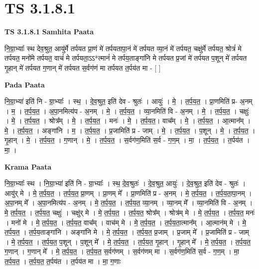 \documentclass[17pt]{extarticle}
\begin{document}
\section{ TS 3.1.8.1 }

\textbf{TS 3.1.8.1 } \newline
\textbf{Samhita Paata} \newline

नि॒ग्रा॒भ्याः᳚ स्थ देव॒श्रुत॒ आयु॑र्मे तर्पयत प्रा॒णं मे॑ तर्पयतापा॒नं मे॑ तर्पयत व्या॒नं मे॑ तर्पयत॒ चक्षु॑र्मे तर्पयत॒ श्रोत्रं॑ मे तर्पयत॒ मनो॑मे तर्पयत॒ वाचं॑ मे तर्पयता॒ऽऽ*त्मानं॑ मे तर्पय॒ताङ्गा॑नि मे तर्पयत प्र॒जां मे॑ तर्पयत प॒शून् मे॑ तर्पयत गृ॒हान् मे॑ तर्पयत ग॒णान् मे॑ तर्पयत स॒र्वग॑णं मा तर्पयत त॒र्पय॑त मा - [  ] \newline

\textbf{Pada Paata} \newline

नि॒ग्रा॒भ्या॑ इति॑ नि - ग्रा॒भ्याः᳚ । स्थ॒ । दे॒व॒श्रुत॒ इति॑ देव - श्रुतः॑ । आयुः॑ । मे॒ । त॒र्प॒य॒त॒ । प्रा॒णमिति॑ प्र- अ॒नम् । म॒ । त॒र्प॒य॒त॒ । अ॒पा॒नमित्य॑प - अ॒नम् । मे॒ । त॒र्प॒य॒त॒ । व्या॒नमिति॑ वि - अ॒नम् । मे॒ । त॒र्प॒य॒त॒ । चक्षुः॑ । मे॒ । त॒र्प॒य॒त॒ । श्रोत्र᳚म् । मे॒ । त॒र्प॒य॒त॒ । मनः॑ । मे॒ । त॒र्प॒य॒त॒। वाच᳚म् । मे॒ । त॒र्प॒य॒त॒ । आ॒त्मान᳚म् । मे॒ । त॒र्प॒य॒त॒ । अङ्गा॑नि । म॒ । त॒र्प॒य॒त॒ । प्र॒जामिति॑ प्र - जाम् । मे॒ । त॒र्प॒य॒त॒ । प॒शून् । मे॒ । त॒र्प॒य॒त॒ । गृ॒हान् । मे॒ । त॒र्प॒य॒त॒ । ग॒णान् । मे॒ । त॒र्प॒य॒त॒ । स॒र्वग॑ण॒मिति॑ स॒र्व - ग॒ण॒म् । मा॒ । त॒र्प॒य॒त॒ । त॒र्पय॑त । मा॒ ।  \newline


\textbf{Krama Paata} \newline

नि॒ग्रा॒भ्याः᳚ स्थ । नि॒ग्रा॒भ्या॑ इति॑ नि - ग्रा॒भ्याः᳚ । स्थ॒ दे॒व॒श्रुतः॑ । दे॒व॒श्रुत॒ आयुः॑ । दे॒व॒श्रुत॒ इति॑ देव - श्रुतः॑ । आयु॑र् मे । मे॒ त॒र्प॒य॒त॒ । त॒र्प॒य॒त॒ प्रा॒णम् । प्रा॒णम् मे᳚ । प्रा॒णमिति॑ प्र - अ॒नम् । मे॒ त॒र्प॒य॒त॒ । त॒र्प॒य॒ता॒पा॒नम् । अ॒पा॒नम् मे᳚ । अ॒पा॒नमित्य॑प - अ॒नम् । मे॒ त॒र्प॒य॒त॒ । त॒र्प॒य॒त॒ व्या॒नम् । व्या॒नम् मे᳚ । व्या॒नमिति॑ वि - अ॒नम् । मे॒ त॒र्प॒य॒त॒ । त॒र्प॒य॒त॒ चक्षुः॑ । चक्षु॑र् मे । मे॒ त॒र्प॒य॒त॒ । त॒र्प॒य॒त॒ श्रोत्र᳚म् । श्रोत्र॑म् मे । मे॒ त॒र्प॒य॒त॒ । त॒र्प॒य॒त॒ मनः॑ । मनो॑ मे । मे॒ त॒र्प॒य॒त॒ । त॒र्प॒य॒त॒ वाच᳚म् । वाच॑म् मे । मे॒ त॒र्प॒य॒त॒ । त॒र्प॒य॒ता॒त्मान᳚म् । आ॒त्मान॑म् मे । मे॒ त॒र्प॒य॒त॒ । त॒र्प॒य॒ताङ्गा॑नि । अङ्गा॑नि मे । मे॒ त॒र्प॒य॒त॒ । त॒र्प॒य॒त॒ प्र॒जाम् । प्र॒जाम् मे᳚ । प्र॒जामिति॑ प्र - जाम् । मे॒ त॒र्प॒य॒त॒ । त॒र्प॒य॒त॒ प॒शून् । प॒शून् मे᳚ । मे॒ त॒र्प॒य॒त॒ । त॒र्प॒य॒त॒ गृ॒हान् । गृ॒हान् मे᳚ । मे॒ त॒र्प॒य॒त॒ । त॒र्प॒य॒त॒ ग॒णान् । ग॒णान् मे᳚ । मे॒ त॒र्प॒य॒त॒ । त॒र्प॒य॒त॒ स॒र्वग॑णम् । स॒र्वग॑णम् मा । स॒र्वग॑ण॒मिति॑ स॒र्व - ग॒ण॒म् । मा॒ त॒र्प॒य॒त॒ । त॒र्प॒य॒त॒ त॒र्पय॑त । त॒र्पय॑त मा । मा॒ ग॒णाः \newline
\end{document}
